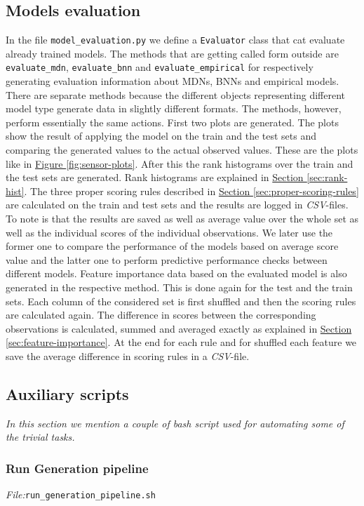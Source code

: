 \documentclass[12pt,a4paper,twoside]{scrartcl}
\numberwithin{equation}{section}
\newcommand{\reffig}[1]{\hyperref[#1]{Figure \ref*{#1}}}
\newcommand{\refsec}[1]{\hyperref[#1]{Section \ref*{#1}}}
\begin{document}
\subsection{Models evaluation}\label{sec:models-eval}
In the file \texttt{model\_evaluation.py} we define a \texttt{Evaluator} class that cat evaluate already trained models. The methods that are getting called form outside are \texttt{evaluate\_mdn}, \texttt{evaluate\_bnn} and \texttt{evaluate\_empirical} for respectively generating evaluation information about MDNs, BNNs and empirical models. There are separate methods because the different objects representing different model type generate data in slightly different formats. The methods, however, perform essentially the same actions. First two plots are generated. The plots show the result of applying the model on the train and the test sets and comparing the generated values to the actual observed values. These are the plots like in \reffig{fig:sensor-plots}. After this the rank histograms over the train and the test sets are generated. Rank histograms are explained in \refsec{sec:rank-hist}. The three proper scoring rules described in \refsec{sec:proper-scoring-rules} are calculated on the train and test sets and the results are logged in \emph{CSV}-files. To note is that the results are saved as well as average value over the whole set as well as the individual scores of the individual observations. We later use the former one to compare the performance of the models based on average score value and the latter one to perform predictive performance checks between different models. Feature importance data based on the evaluated model is also generated in the respective method. This is done again for the test and the train sets. Each column of the considered set is first shuffled and then the scoring rules are calculated again. The difference in scores between the corresponding observations is calculated, summed and averaged exactly as explained in \refsec{sec:feature-importance}. At the end for each rule and for shuffled each feature we save the average difference in scoring rules in a \emph{CSV}-file.
\subsection{Auxiliary scripts}\label{sec:aux-scripts}
\noindent\emph{In this section we mention a couple of bash script used for automating some of the trivial tasks.} 
\subsubsection{Run Generation pipeline}\label{sec:gen-pipe}
\noindent\emph{File:}\texttt{run\_generation\_pipeline.sh}
\end{document}

